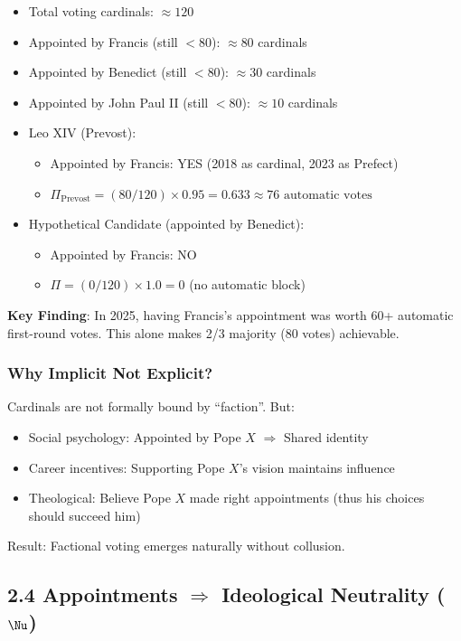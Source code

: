 \begin{itemize}
\item Total voting cardinals: $\approx 120$
\item Appointed by Francis (still $<80$): $\approx 80$ cardinals
\item Appointed by Benedict (still $<80$): $\approx 30$ cardinals
\item Appointed by John Paul II (still $<80$): $\approx 10$ cardinals

\item Leo XIV (Prevost):
	\begin{itemize}
	\item Appointed by Francis: YES (2018 as cardinal, 2023 as Prefect)
	\item $\Pi_{\text{Prevost}} = (80 / 120) \times 0.95 = 0.633 \approx 76 \text{ automatic votes}$
	\end{itemize}

\item Hypothetical Candidate (appointed by Benedict):
	\begin{itemize}
	\item Appointed by Francis: NO
	\item $\Pi = (0 / 120) \times 1.0 = 0$ (no automatic block)
	\end{itemize}
\end{itemize}

\textbf{Key Finding}: In 2025, having Francis's appointment was worth 60+ automatic first-round votes. This alone makes 2/3 majority (80 votes) achievable.

\subsubsection{Why Implicit Not Explicit?}

Cardinals are not formally bound by ``faction''. But:
\begin{itemize}
\item Social psychology: Appointed by Pope $X$ $\Rightarrow$ Shared identity
\item Career incentives: Supporting Pope $X$'s vision maintains influence
\item Theological: Believe Pope $X$ made right appointments (thus his choices should succeed him)
\end{itemize}

Result: Factional voting emerges naturally without collusion.

\subsection{2.4 Appointments $\Rightarrow$ Ideological Neutrality ($\Nu$)}

